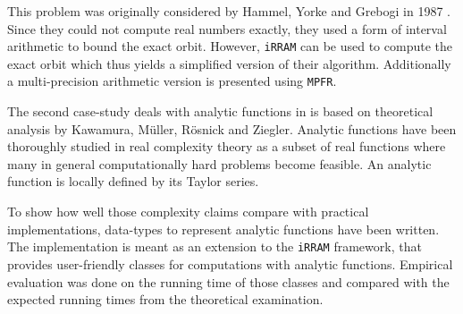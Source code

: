 \documentclass[]{article}
\newcommand{\code}{\texttt}
\newcommand{\irram}{\code{iRRAM}\xspace}
\begin{document}
This problem was originally considered by Hammel, Yorke and Grebogi in 1987
\cite{Hammel1987}. 
Since they could not compute real numbers exactly, they used a form of interval
arithmetic to bound the exact orbit.
However, \irram can be used to compute the exact orbit which thus yields a
simplified version of their algorithm.
Additionally a multi-precision arithmetic version is presented using
\code{MPFR}.

The second case-study deals with analytic functions in is based on theoretical
analysis by Kawamura, M\"{u}ller, R\"{o}snick and Ziegler.
Analytic functions have been thoroughly studied in real complexity theory as a
subset of real functions where many in general computationally hard problems become feasible. 
An analytic function is locally defined by its Taylor series.

To show how well those complexity claims compare with practical
implementations, data-types to represent analytic functions have been written.
The implementation is meant as an extension to the \irram framework, that
provides user-friendly classes for computations with analytic functions.
Empirical evaluation was done on the running time of those classes and compared
with the expected running times from the theoretical examination.
\end{document}
